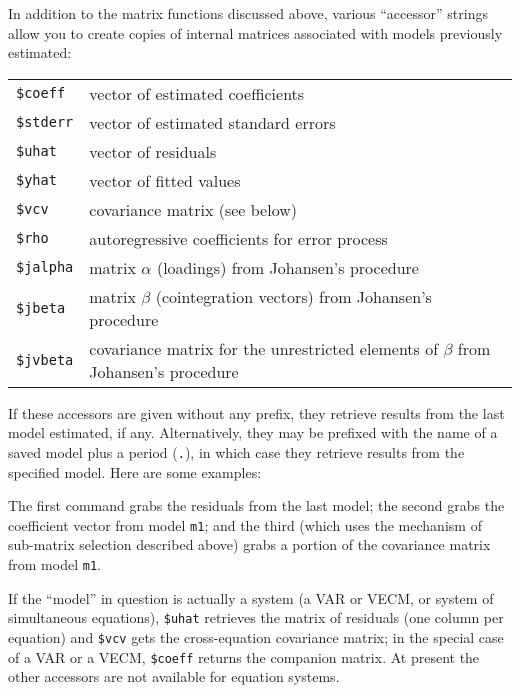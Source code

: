 In addition to the matrix functions discussed above,
various ``accessor'' strings allow you to create copies of internal
matrices associated with models previously estimated:

\begin{center}
\begin{tabular}{ll}
\texttt{\$coeff}  & vector of estimated coefficients \\
\texttt{\$stderr} & vector of estimated standard errors \\
\texttt{\$uhat}   & vector of residuals \\
\texttt{\$yhat}   & vector of fitted values \\
\texttt{\$vcv}    & covariance matrix (see below) \\
\texttt{\$rho}    & autoregressive coefficients for error process \\
\texttt{\$jalpha} & matrix $\alpha$ (loadings) from Johansen's procedure \\
\texttt{\$jbeta}  & matrix $\beta$ (cointegration vectors) from
Johansen's procedure \\
\texttt{\$jvbeta} & covariance matrix for the unrestricted elements of
$\beta$ from Johansen's procedure
\end{tabular}
\end{center}

If these accessors are given without any prefix, they retrieve results
from the last model estimated, if any.  Alternatively, they may be
prefixed with the name of a saved model plus a period (\texttt{.}), in
which case they retrieve results from the specified model.  Here are
some examples:
%
%
The first command grabs the residuals from the last model; the second
grabs the coefficient vector from model \texttt{m1}; and the third
(which uses the mechanism of sub-matrix selection described above)
grabs a portion of the covariance matrix from model \texttt{m1}.

If the ``model'' in question is actually a system (a VAR or VECM, or
system of simultaneous equations), \verb|$uhat| retrieves the
matrix of residuals (one column per equation) and \verb|$vcv| gets
the cross-equation covariance matrix; in the special case of a VAR or
a VECM, \verb|$coeff| returns the companion matrix. At present the
other accessors are not available for equation systems.

